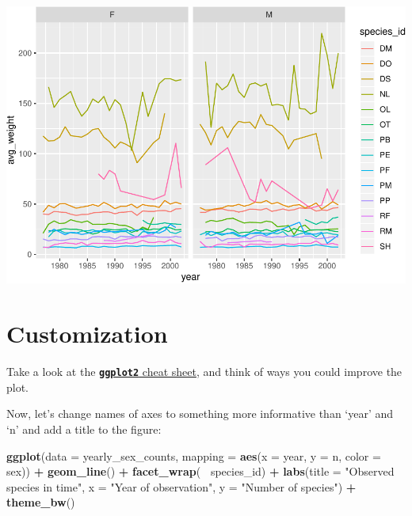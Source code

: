 \documentclass[]{book}
\newenvironment{Shaded}{\begin{snugshade}}{\end{snugshade}}
\newcommand{\KeywordTok}[1]{\textcolor[rgb]{0.13,0.29,0.53}{\textbf{#1}}}
\newcommand{\DataTypeTok}[1]{\textcolor[rgb]{0.13,0.29,0.53}{#1}}
\newcommand{\StringTok}[1]{\textcolor[rgb]{0.31,0.60,0.02}{#1}}
\newcommand{\OperatorTok}[1]{\textcolor[rgb]{0.81,0.36,0.00}{\textbf{#1}}}
\newcommand{\NormalTok}[1]{#1}
\begin{document}
\includegraphics{img/R-ecology-average-weight-time-facet-sex-columns-1.pdf}

\section{Customization}\label{customization}

Take a look at the
\href{https://www.rstudio.com/wp-content/uploads/2016/11/ggplot2-cheatsheet-2.1.pdf}{\textbf{\texttt{ggplot2}}
cheat sheet}, and think of ways you could improve the plot.

Now, let's change names of axes to something more informative than
`year' and `n' and add a title to the figure:

\begin{Shaded}
\begin{Highlighting}[]
\KeywordTok{ggplot}\NormalTok{(}\DataTypeTok{data =}\NormalTok{ yearly_sex_counts, }\DataTypeTok{mapping =} \KeywordTok{aes}\NormalTok{(}\DataTypeTok{x =}\NormalTok{ year, }\DataTypeTok{y =}\NormalTok{ n, }\DataTypeTok{color =}\NormalTok{ sex)) }\OperatorTok{+}
\StringTok{    }\KeywordTok{geom_line}\NormalTok{() }\OperatorTok{+}
\StringTok{    }\KeywordTok{facet_wrap}\NormalTok{(}\OperatorTok{~}\StringTok{ }\NormalTok{species_id) }\OperatorTok{+}
\StringTok{    }\KeywordTok{labs}\NormalTok{(}\DataTypeTok{title =} \StringTok{"Observed species in time"}\NormalTok{,}
         \DataTypeTok{x =} \StringTok{"Year of observation"}\NormalTok{,}
         \DataTypeTok{y =} \StringTok{"Number of species"}\NormalTok{) }\OperatorTok{+}
\StringTok{    }\KeywordTok{theme_bw}\NormalTok{()}
\end{Highlighting}
\end{Shaded}
\end{document}
